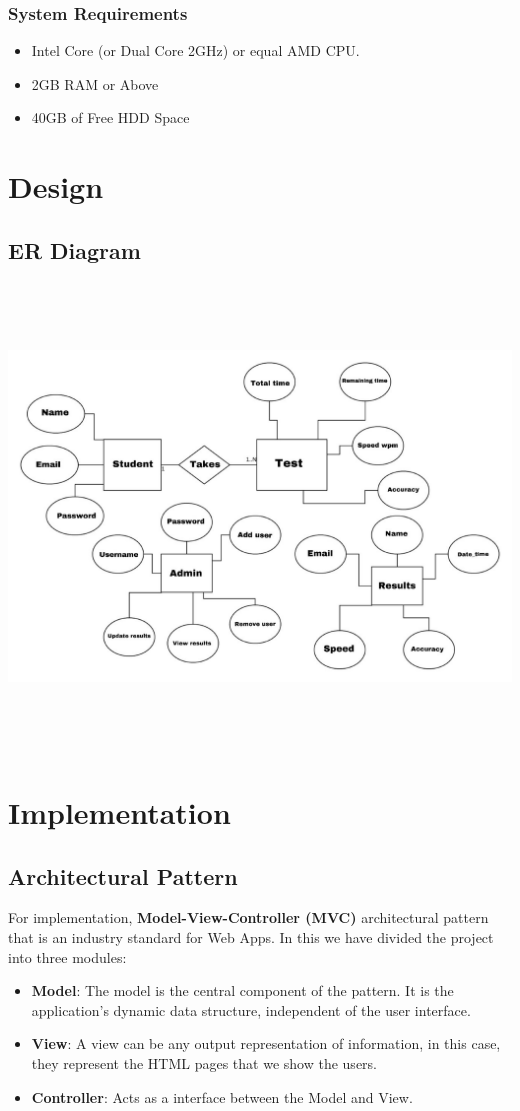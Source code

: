 \documentclass{mnnit}
\begin{document}
\subsection{System Requirements}
\begin{itemize}
    \item Intel Core (or Dual Core 2GHz) or equal AMD CPU.
    \item 2GB RAM or Above
    \item 40GB of Free HDD Space
\end{itemize}

\chapter{Design}
\section{ER Diagram}
\includegraphics[width=\textwidth, height=350pt]{images/ER.jpg}
\chapter{Implementation}
\section{Architectural Pattern}
For implementation, \textbf{Model-View-Controller (MVC)} architectural pattern that is an industry standard for Web Apps. In this we have divided the project into three modules:
\begin{itemize}
    \item \textbf{Model}: The model is the central component of the pattern. It is the application's dynamic data structure, independent of the user interface.
    \item \textbf{View}: A view can be any output representation of information, in this case, they represent the HTML pages that we show the users.
    \item \textbf{Controller}: Acts as a interface between the Model and View.
\end{itemize}
\end{document}
